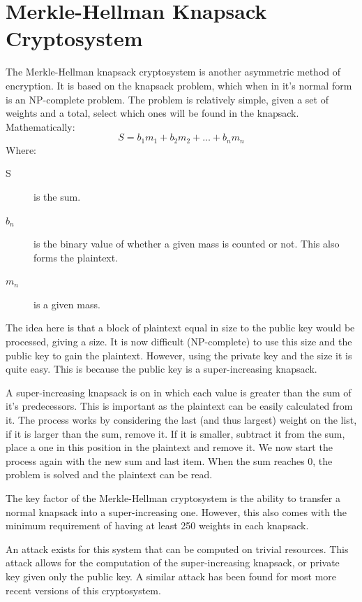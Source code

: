 	\section{Merkle-Hellman Knapsack Cryptosystem}
		The Merkle-Hellman knapsack cryptosystem is another asymmetric method of encryption. 
		It is based on the knapsack problem, which when in it's normal form is an NP-complete problem. 
		The problem is relatively simple, given a set of weights and a total, select which ones will be found in the knapsack. 
		Mathematically:
		\[S = b_1m_1 + b_2m_2 +\ldots+ b_nm_n\]
		Where:
		\begin{description}
			\item[S] is the sum.
			\item[$b_n$] is the binary value of whether a given mass is counted or not. 
				This also forms the plaintext. 
			\item[$m_n$] is a given mass. 
		\end{description}

		The idea here is that a block of plaintext equal in size to the public key would be processed, giving a size. 
		It is now difficult (NP-complete) to use this size and the public key to gain the plaintext. 
		However, using the private key and the size it is quite easy. 
		This is because the public key is a super-increasing knapsack. 

		A super-increasing knapsack is on in which each value is greater than the sum of it's predecessors. 
		This is important as the plaintext can be easily calculated from it. 
		The process works by considering the last (and thus largest) weight on the list, if it is larger than the sum, remove it.
		If it is smaller, subtract it from the sum, place a one in this position in the plaintext and remove it.
		We now start the process again with the new sum and last item. 
		When the sum reaches 0, the problem is solved and the plaintext can be read. 

		The key factor of the Merkle-Hellman cryptosystem is the ability to transfer a normal knapsack into a super-increasing one.
		However, this also comes with the minimum requirement of having at least 250 weights in each knapsack. 

		An attack exists for this system that can be computed on trivial resources\cite{BrokenKnapsack}. 
		This attack allows for the computation of the super-increasing knapsack, or private key given only the public key. 
		A similar attack has been found for most more recent versions of this cryptosystem. 
